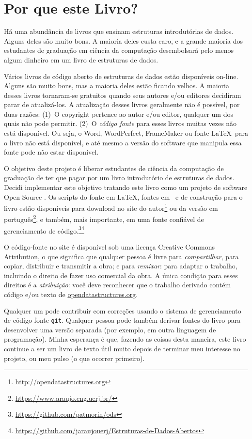\chapter*{Por que este Livro?}

Há uma abundância de livros que ensinam estruturas introdutórias de dados.
Alguns deles são muito bons. A maioria deles custa caro, e a grande 
maioria dos estudantes de graduação em ciência da computação 
desembolsará pelo menos algum dinheiro em um livro de estruturas 
de dados.

Vários livros de código aberto de estruturas de dados estão disponíveis on-line. Alguns são muito bons, mas a maioria deles estão ficando velhos. A maioria desses livros tornaram-se gratuitos quando seus autores e/ou editores decidiram parar de atualizá-los. A atualização desses livros geralmente não é possível, por duas razões: (1)~O copyright pertence ao autor e/ou editor, qualquer um dos quais não pode permitir. (2)~O \emph{código fonte} para esses livros muitas vezes não está disponível. Ou seja, o Word, WordPerfect, FrameMaker ou fonte \LaTeX\ para o livro não está disponível, e até mesmo a versão do software que manipula essa fonte pode não estar disponível.

O objetivo deste projeto é liberar estudantes de ciência da computação de graduação de ter que pagar por um livro introdutório de estruturas de dados.
Decidi implementar este objetivo tratando este livro como um projeto de software Open Source
. 
Os scripts do fonte em \LaTeX, fontes em \lang\ e de construção para o livro estão disponíveis para download no site do autor\footnote{\url{http://opendatastructures.org}} ou da versão em português\footnote{\url{https://www.araujo.eng.uerj.br/}}, e também, mais importante, em uma fonte confiável de gerenciamento de código.\footnote{\url{https://github.com/patmorin/ods}}\footnote{\url{https://github.com/jaraujouerj/Estruturas-de-Dados-Abertos}}

O código-fonte no site é disponível sob uma licença Creative Commons Attribution, o que significa que qualquer pessoa é livre para \emph{compartilhar},
 para copiar, distribuir e transmitir a obra; e para \emph{remixar}:
para adaptar o trabalho, incluindo o direito de fazer uso comercial da obra. A única condição para esses direitos é a \emph{atribuição}: você deve reconhecer que o trabalho derivado contém código e/ou texto de \url{opendatastructures.org}.

Qualquer um pode contribuir com correções usando o sistema de gerenciamento de código-fonte \texttt{git}.
Qualquer pessoa pode também derivar fontes do livro para desenvolver uma versão separada (por exemplo, em outra linguagem de programação).
Minha esperança é que, fazendo as coisas desta maneira, este livro continue a ser um livro de texto útil muito depois de terminar meu interesse no projeto, ou meu pulso (o que ocorrer primeiro).




